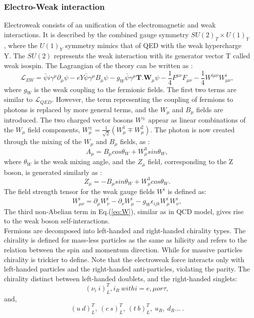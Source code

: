 \subsubsection{Electro-Weak interaction}
Electroweak consists of an unification of the electromagnetic and weak interactions. It is described by the combined gauge symmetry $SU(2)_{T}\times U(1)_{Y}$, where the $U(1)_{Y}$ symmetry mimics that of QED with the weak hypercharge Y. The $SU(2)$ represents the weak interaction with its generator vector T called weak isospin. The Lagrangian of the theory can be written as : 
\begin{equation}
    \mathcal{L}_{EW} = \bar{\psi}i\gamma^\mu\partial_\mu\psi -eY\bar{\psi}\gamma^{\mu}B_{\mu}\psi-g_{W}\bar{\psi}\gamma^{\mu}\textbf{T.W$_\mu$}\psi
    -\frac{1}{4}F^{\mu\nu}F_{\mu\nu} - \frac{1}{4}W^{i\mu\nu}W^i_{\mu\nu},
\end{equation}
where $g_{W}$ is the weak coupling to the fermionic fields. The first two terms are similar to $\mathcal{L}_{QED}$. However, the term representing the coupling of fermions to photons is replaced by more general terms, and the $W_{\mu}$ and $B_{\mu}$ fields are introduced. The two charged vector bosons $W^\pm$ appear as linear combinations of the $W_{\mu}$ field components, $W^{\pm}_{\mu} = \frac{1}{\sqrt{2}}(W^1_{\mu}\mp W^2_{\mu})$. The photon is now created through the mixing of the $W_{\mu}$ and $B_{\mu}$ fields, as :
\begin{equation}
    A_{\mu} = B_{\mu}cos\theta_{W} + W^3_{\mu}sin\theta_{W},
\end{equation}
where $\theta_{W}$ is the weak mixing angle, and the $Z_{\mu}$ field, corresponding to the Z boson, is generated similarly as : 
\begin{equation}
     Z_{\mu} = -B_{\mu}sin\theta_{W} + W^3_{\mu}cos\theta_{W}.
\end{equation}
The field strength tensor for the weak gauge fields $W^i$ is defined as:
\begin{equation}
    W^{i}_{\mu\nu} = \partial_{\mu}W^i_{\nu} - \partial_{\nu}W^i_{\mu} - g_{W}\epsilon_{ijk}W^i_{\mu}W^i_{\nu},
    \label{eq:W}
\end{equation}
The third non-Abelian term in Eq.(\ref{eq:W}), similar as in QCD model, gives rise to the weak boson self-interactions. \\
Fermions are decomposed into left-handed and right-handed chirality types. The chirality is defined for mass-less particles as the same as hilicity and refers to the relation between the spin and momentum direction. While for massive particles chirality is trickier to define. Note that the electroweak force interacts only with left-handed particles and the right-handed anti-particles, violating the parity. The chirality distinct between left-handed doublets, and the right-handed singlets:
\begin{equation}
    (\nu_i \ i)^T_L, i_R \ with i = e, \mu or \tau,
\end{equation}
and, 
\begin{equation}
    (u \ d)^T_L, \ (c \ s)^T_L, \ (t \ b)^T_L, \ u_R, \ d_R ... \ . 
\end{equation}

